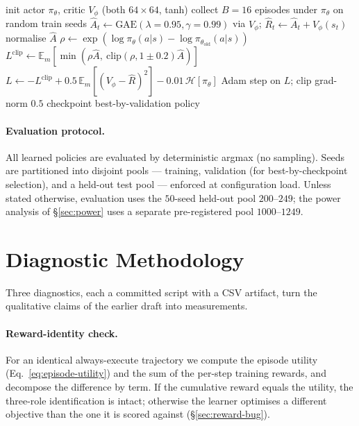 \documentclass[10pt,twocolumn]{article}
\begin{document}
\begin{algorithm}[t]
\small
\caption{PPO trainer (actor shared with REINFORCE)}
\label{alg:ppo}
\begin{algorithmic}[1]
\State init actor $\pi_\theta$, critic $V_\phi$ (both $64\times64$, tanh)
  \State collect $B{=}16$ episodes under $\pi_\theta$ on random train seeds
  \State $\hat A_t \gets \text{GAE}(\lambda{=}0.95,\gamma{=}0.99)$ via $V_\phi$;
         $\hat R_t \gets \hat A_t + V_\phi(s_t)$
  \State normalise $\hat A$
    \State $\rho \gets \exp(\log\pi_\theta(a|s)-\log\pi_{\theta_{\text{old}}}(a|s))$
    \State $L^{\text{clip}} \gets \mathbb{E}_m[\min(\rho\hat A,\ \mathrm{clip}(\rho,1{\pm}0.2)\hat A)]$
    \State $L \gets -L^{\text{clip}} + 0.5\,\mathbb{E}_m[(V_\phi-\hat R)^2] - 0.01\,\mathcal{H}[\pi_\theta]$
    \State Adam step on $L$; clip grad-norm $0.5$
  \EndFor
  \State checkpoint best-by-validation policy
\EndFor
\end{algorithmic}
\end{algorithm}

\paragraph{Evaluation protocol.} All learned policies are evaluated by
deterministic argmax (no sampling). Seeds are partitioned into disjoint pools ---
training, validation (for best-by-checkpoint selection), and a held-out test pool
--- enforced at configuration load. Unless stated otherwise, evaluation uses the
$50$-seed held-out pool $200$--$249$; the power analysis of \S\ref{sec:power} uses
a separate pre-registered pool $1000$--$1249$.

\section{Diagnostic Methodology}
\label{sec:methods}

Three diagnostics, each a committed script with a CSV artifact, turn the
qualitative claims of the earlier draft into measurements.

\paragraph{Reward-identity check.} For an identical always-execute trajectory we
compute the episode utility (Eq.~\eqref{eq:episode-utility}) and the sum of the
per-step training rewards, and decompose the difference by term. If the cumulative
reward equals the utility, the three-role identification is intact; otherwise the
learner optimises a different objective than the one it is scored against
(\S\ref{sec:reward-bug}).
\end{document}

